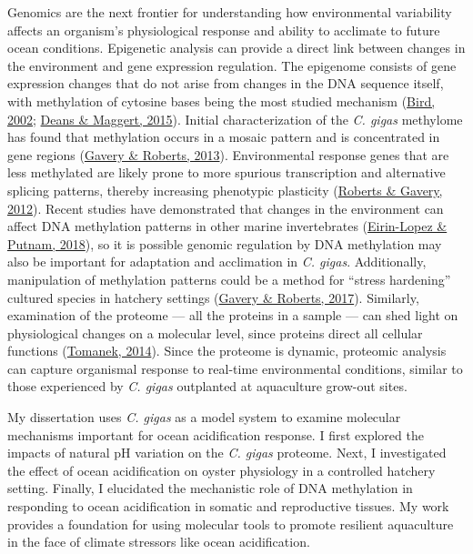 \documentclass [11pt, proquest] {uwthesis}[2015/03/03]
\begin{document}
Genomics are the next frontier for understanding how environmental variability affects an organism's physiological response and ability to acclimate to future ocean conditions. Epigenetic analysis can provide a direct link between changes in the environment and gene expression regulation. The epigenome consists of gene expression changes that do not arise from changes in the DNA sequence itself, with methylation of cytosine bases being the most studied mechanism (\protect\hyperlink{ref-Bird2002}{Bird, 2002}; \protect\hyperlink{ref-Deans2015}{Deans \& Maggert, 2015}). Initial characterization of the \emph{C. gigas} methylome has found that methylation occurs in a mosaic pattern and is concentrated in gene regions (\protect\hyperlink{ref-Gavery2013}{Gavery \& Roberts, 2013}). Environmental response genes that are less methylated are likely prone to more spurious transcription and alternative splicing patterns, thereby increasing phenotypic plasticity (\protect\hyperlink{ref-Roberts2012}{Roberts \& Gavery, 2012}). Recent studies have demonstrated that changes in the environment can affect DNA methylation patterns in other marine invertebrates (\protect\hyperlink{ref-Eirin-Lopez2018}{Eirin-Lopez \& Putnam, 2018}), so it is possible genomic regulation by DNA methylation may also be important for adaptation and acclimation in \emph{C. gigas}. Additionally, manipulation of methylation patterns could be a method for ``stress hardening'' cultured species in hatchery settings (\protect\hyperlink{ref-Gavery2017}{Gavery \& Roberts, 2017}). Similarly, examination of the proteome --- all the proteins in a sample --- can shed light on physiological changes on a molecular level, since proteins direct all cellular functions (\protect\hyperlink{ref-Tomanek2014}{Tomanek, 2014}). Since the proteome is dynamic, proteomic analysis can capture organismal response to real-time environmental conditions, similar to those experienced by \emph{C. gigas} outplanted at aquaculture grow-out sites.

My dissertation uses \emph{C. gigas} as a model system to examine molecular mechanisms important for ocean acidification response. I first explored the impacts of natural pH variation on the \emph{C. gigas} proteome. Next, I investigated the effect of ocean acidification on oyster physiology in a controlled hatchery setting. Finally, I elucidated the mechanistic role of DNA methylation in responding to ocean acidification in somatic and reproductive tissues. My work provides a foundation for using molecular tools to promote resilient aquaculture in the face of climate stressors like ocean acidification.
\end{document}

